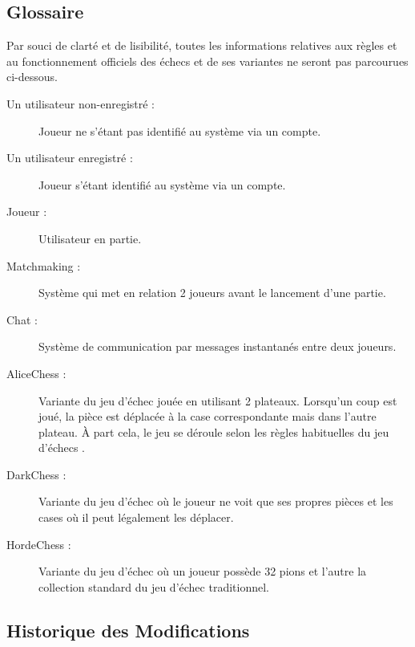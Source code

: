 \documentclass[10pt, a4paper]{article}
\begin{document}
		\subsection{Glossaire} Par souci de clarté et de lisibilité, toutes les informations relatives aux règles et au fonctionnement officiels des échecs et de ses variantes ne seront pas parcourues ci-dessous.
		\begin{description}
		\item[Un utilisateur non-enregistré :] Joueur ne s'étant pas identifié au système via un compte.
		\item[Un utilisateur enregistré :] Joueur s'étant identifié au système via un compte.
		\item[Joueur :] Utilisateur en partie.
		\item[Matchmaking :] Système qui met en relation 2 joueurs avant le lancement d'une partie.
		\item[Chat :] Système de communication par messages instantanés entre deux joueurs.
		\item[AliceChess :] Variante du jeu d'échec jouée en utilisant 2 plateaux. Lorsqu'un coup est joué, la pièce est déplacée à la case correspondante mais dans l'autre plateau. À part cela, le jeu se déroule selon les règles habituelles du jeu d'échecs .
		\item[DarkChess :] Variante du jeu d'échec où le joueur ne voit que ses propres pièces et les cases où il peut légalement les déplacer.
		\item[HordeChess :] Variante du jeu d'échec où un joueur possède 32 pions et l'autre la collection standard du jeu d'échec traditionnel.
		\end{description}
		\clearpage

		\subsection{Historique des Modifications}
\end{document}
